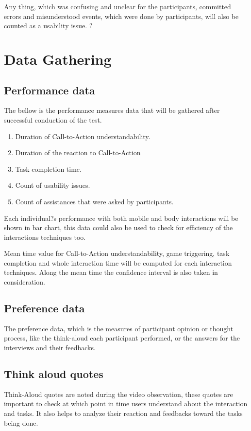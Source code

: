 Any thing, which was confusing and unclear for the participants, committed errors and misunderstood events, which were done by participants, will also be counted as a usability issue. 
?
\section{Data Gathering }
 
\subsection{Performance data}
The bellow is the performance measures data that will be gathered after successful conduction of the test.
\begin{enumerate}
\item	Duration of Call-to-Action understandability.
\item	Duration of the reaction to Call-to-Action
\item	Task completion time.
\item	Count of usability issues.
\item	Count of assistances that were asked by participants.
\end{enumerate}
 
Each individual?s performance with both mobile and body interactions will be shown in bar chart, this data could also be used to check for efficiency of the interactions techniques too.
 
Mean time value for Call-to-Action understandability, game triggering, task completion and whole interaction time will be computed for each interaction techniques. Along the mean time the confidence interval is also taken in consideration.

\subsection{Preference data}
The preference data, which is the measures of participant opinion or thought process, like the think-aloud each participant performed, or the answers for the interviews and their feedbacks.

\subsection{Think aloud quotes}
Think-Aloud quotes are noted during the video observation, these quotes are important to check at which point in time users understand about the interaction and tasks. It also helps to analyze their reaction and feedbacks toward the tasks being done.

